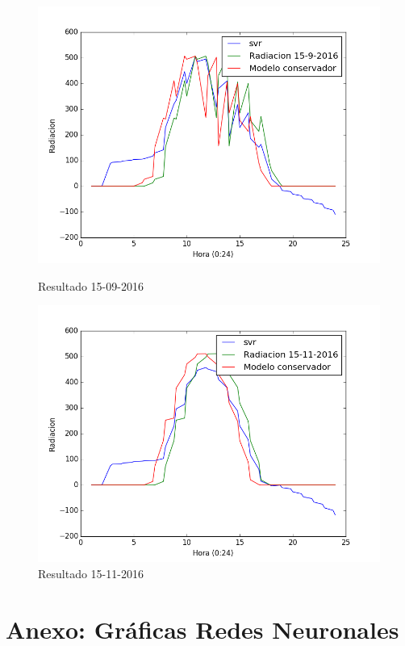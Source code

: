 \begin{figure}[htb]
%
		\includegraphics[width=\linewidth]{figures/svr_2016091520160915.png}
		\caption{Resultado 15-09-2016 \label{resultado_svr_5}}
\endminipage\hfill
{}%
		\includegraphics[width=\linewidth]{figures/svr_2016111520161115.png}
		\caption{Resultado 15-11-2016 \label{resultado_svr_6}}
\endminipage
\end{figure}

\chapter{Anexo: Gráficas Redes Neuronales}
\label{Appendix:Key3}

